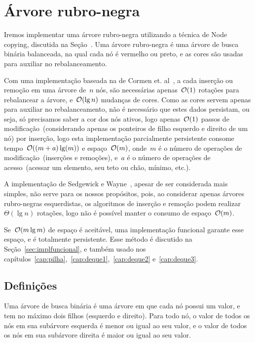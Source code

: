 \documentclass[../../main.tex]{subfiles}
\begin{document}
\chapter{Árvore rubro-negra} \label{cap:rubronegra}

Iremos implementar uma árvore rubro-negra utilizando a técnica de Node copying, discutida na Seção~\label{sec:nodecopying}. Uma árvore rubro-negra é uma árvore de busca binária balanceada, na qual cada nó é vermelho ou preto, e as cores são usadas para auxiliar no rebalanceamento.

Com uma implementação baseada na de Cormen et. al~\cite{CormenRedBlack}, a cada inserção ou remoção em uma árvore de~$n$ nós, são necessárias apenas~$\mathcal{O}(1)$ rotações para rebalancear a árvore, e~$\mathcal{O}(\lg n)$ mudanças de cores. Como as cores servem apenas para auxiliar no rebalanceamento, não é necessário que estes dados persistam, ou seja, só precisamos saber a cor dos nós ativos, logo apenas~$\mathcal{O}(1)$ passos de modificação~(considerando apenas os ponteiros de filho esquerdo e direito de um nó) por inserção, logo esta implementação parcialmente persistente consome tempo~$\mathcal{O}((m + a) \lg(m))$ e espaço~$\mathcal{O}(m)$, onde~$m$ é o número de operações de modificação~(inserções e remoções), e~$a$ é o número de operações de acesso~(acessar um elemento, seu teto ou chão, mínimo, etc.).

A implementação de Sedgewick e Wayne~\cite{SedgewickRedBlack}, apesar de ser considerada mais simples, não serve para os nossos propósitos, pois, ao considerar apenas árvores rubro-negras esquerdistas, os algoritmos de inserção e remoção podem realizar~$\Theta(\lg n)$ rotações, logo não é possível manter o consumo de espaço~$\mathcal{O}(m)$.

Se~$\mathcal{O}(m \lg m)$ de espaço é aceitável, uma implementação funcional garante esse espaço, e é totalmente persistente. Esse método é discutido na Seção~\ref{sec:implfuncional}, e também usado nos capítulos~\ref{cap:pilha},~\ref{cap:deque1},~\ref{cap:deque2} e~\ref{cap:deque3}.

\section{Definições}

Uma árvore de busca binária é uma árvore em que cada nó possui um valor, e tem no máximo dois filhos (esquerdo e direito). Para todo nó, o valor de todos os nós em sua subárvore esquerda é menor ou igual ao seu valor, e o valor de todos os nós em sua subárvore direita é maior ou igual ao seu valor.
\end{document}

